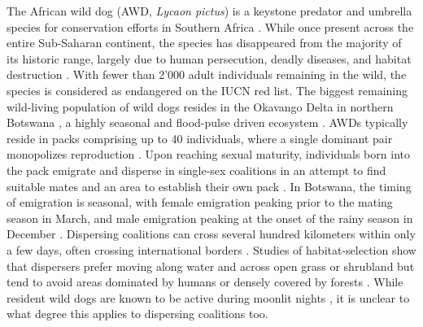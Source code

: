 \documentclass[abstract=on,10pt,a4paper,bibliography=totocnumbered]{article}
\begin{document}
The African wild dog (AWD, \textit{Lycaon pictus}) is a keystone predator and
umbrella species for conservation efforts in Southern Africa
\citep{Dalerum.2008}. While once present across the entire Sub-Saharan
continent, the species has disappeared from the majority of its historic range,
largely due to human persecution, deadly diseases, and habitat destruction
\citep{Woodroffe.2020a}. With fewer than 2'000 adult individuals remaining in
the wild, the species is considered as endangered on the IUCN red list. The
biggest remaining wild-living population of wild dogs resides in the Okavango
Delta in northern Botswana \citep{McNutt.1996, Woodroffe.2020a}, a highly
seasonal and flood-pulse driven ecosystem \citep{Wolski.2017}. AWDs typically
reside in packs comprising up to 40 individuals, where a single dominant pair
monopolizes reproduction \citep{Frame.1979, Malcolm.1982}. Upon reaching sexual
maturity, individuals born into the pack emigrate and disperse in single-sex
coalitions in an attempt to find suitable mates and an area to establish their
own pack \citep{McNutt.1996}. In Botswana, the timing of emigration is seasonal,
with female emigration peaking prior to the mating season in March, and male
emigration peaking at the onset of the rainy season in December
\citep{Behr.2020}. Dispersing coalitions can cross several hundred kilometers
within only a few days, often crossing international borders
\citep{Davies-Mostert.2012, Masenga.2016, Cozzi.2020, Sandoval-Seres.2022}.
Studies of habitat-selection show that dispersers prefer moving along water and
across open grass or shrubland but tend to avoid areas dominated by humans or
densely covered by forests \citep{ONeill.2020, Hofmann.2021}. While resident
wild dogs are known to be active during moonlit nights \citep{Cozzi.2012}, it is
unclear to what degree this applies to dispersing coalitions too.
\end{document}
